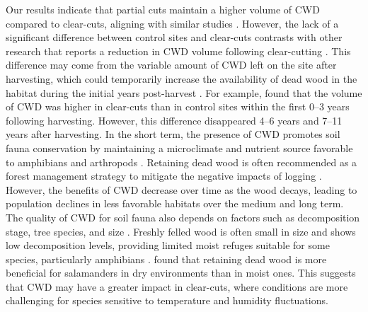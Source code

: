 Our results indicate that partial cuts maintain a higher volume of CWD compared to clear-cuts, aligning with similar studies \citep{Nolet2018Comparingeffects,Ochs2022Responseterrestrial}.  
However, the lack of a significant difference between control sites and clear-cuts contrasts with other research that reports a reduction in CWD volume following clear-cutting \citep{Mazerolle2021Woodlandsalamander}.  
This difference may come from the variable amount of CWD left on the site after harvesting, which could temporarily increase the availability of dead wood in the habitat during the initial years post-harvest \citep{McCarthy1994Distributionabundance}.  
For example, \cite{Ochs2022Responseterrestrial} found that the volume of CWD was higher in clear-cuts than in control sites within the first 0–3 years following harvesting. 
However, this difference disappeared 4–6 years and 7–11 years after harvesting. 
In the short term, the presence of CWD promotes soil fauna conservation by maintaining  a microclimate and nutrient source favorable to amphibians and arthropods \citep{spotilaRoleTemperatureWater1972,Huhta1976Effectsclearcutting,Seibold2021contributioninsects,Ochs2022Responseterrestrial}.  
Retaining dead wood is often recommended as a forest management strategy to mitigate the negative impacts of logging \citep{McKenny2006Effectsstructural}.  
However, the benefits of CWD decrease over time as the wood decays, leading to population declines in less favorable habitats over the medium and long term.  
The quality of CWD for soil fauna also depends on factors such as decomposition stage, tree species, and size \citep{Bunnell2010woodbiodiversity}.  
Freshly felled wood is often small in size and shows low decomposition levels, providing limited moist refuges suitable for some species, particularly amphibians \citep{Petranka1994Effectstimber,Morneault2004effectshelterwood,Owens2008Amphibianreptile,Otto2013Amphibianresponse}.  
\cite{Petranka1994Effectstimber} found that retaining dead wood is more beneficial for salamanders in dry environments than in moist ones.  
This suggests that CWD may have a greater impact in clear-cuts, where conditions are more challenging for species sensitive to temperature and humidity fluctuations.



